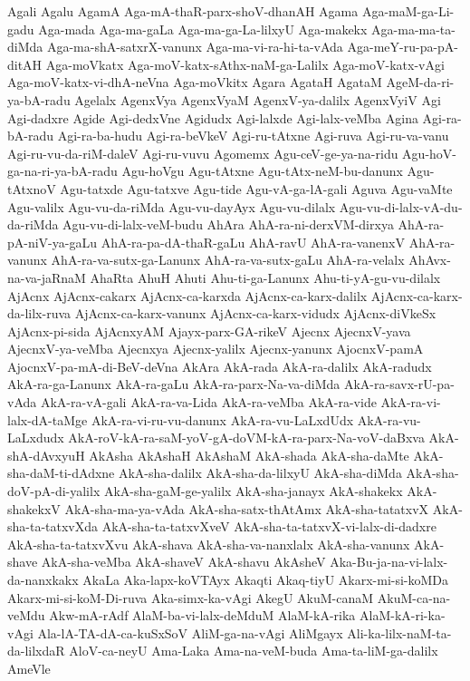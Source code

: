 {Agali
Agalu
AgamA
Aga-mA-thaR-parx-shoV-dhanAH
Agama
Aga-maM-ga-Li-gadu
Aga-mada
Aga-ma-gaLa
Aga-ma-ga-La-lilxyU
Aga-makekx
Aga-ma-ma-ta-diMda
Aga-ma-shA-satxrX-vanunx
Aga-ma-vi-ra-hi-ta-vAda
Aga-meY-ru-pa-pA-ditAH
Aga-moVkatx
Aga-moV-katx-sAthx-naM-ga-Lalilx
Aga-moV-katx-vAgi
Aga-moV-katx-vi-dhA-neVna
Aga-moVkitx
Agara
AgataH
AgataM
AgeM-da-ri-ya-bA-radu
Agelalx
AgenxVya
AgenxVyaM
AgenxV-ya-dalilx
AgenxVyiV
Agi
Agi-dadxre
Agide
Agi-dedxVne
Agidudx
Agi-lalxde
Agi-lalx-veMba
Agina
Agi-ra-bA-radu
Agi-ra-ba-hudu
Agi-ra-beVkeV
Agi-ru-tAtxne
Agi-ruva
Agi-ru-va-vanu
Agi-ru-vu-da-riM-daleV
Agi-ru-vuvu
Agomemx
Agu-ceV-ge-ya-na-ridu
Agu-hoV-ga-na-ri-ya-bA-radu
Agu-hoVgu
Agu-tAtxne
Agu-tAtx-neM-bu-danunx
Agu-tAtxnoV
Agu-tatxde
Agu-tatxve
Agu-tide
Agu-vA-ga-lA-gali
Aguva
Agu-vaMte
Agu-valilx
Agu-vu-da-riMda
Agu-vu-dayAyx
Agu-vu-dilalx
Agu-vu-di-lalx-vA-du-da-riMda
Agu-vu-di-lalx-veM-budu
AhAra
AhA-ra-ni-derxVM-dirxya
AhA-ra-pA-niV-ya-gaLu
AhA-ra-pa-dA-thaR-gaLu
AhA-ravU
AhA-ra-vanenxV
AhA-ra-vanunx
AhA-ra-va-sutx-ga-Lanunx
AhA-ra-va-sutx-gaLu
AhA-ra-velalx
AhAvx-na-va-jaRnaM
AhaRta
AhuH
Ahuti
Ahu-ti-ga-Lanunx
Ahu-ti-yA-gu-vu-dilalx
AjAcnx
AjAcnx-cakarx
AjAcnx-ca-karxda
AjAcnx-ca-karx-dalilx
AjAcnx-ca-karx-da-lilx-ruva
AjAcnx-ca-karx-vanunx
AjAcnx-ca-karx-vidudx
AjAcnx-diVkeSx
AjAcnx-pi-sida
AjAcnxyAM
Ajayx-parx-GA-rikeV
Ajecnx
AjecnxV-yava
AjecnxV-ya-veMba
Ajecnxya
Ajecnx-yalilx
Ajecnx-yanunx
AjocnxV-pamA
AjocnxV-pa-mA-di-BeV-deVna
AkAra
AkA-rada
AkA-ra-dalilx
AkA-radudx
AkA-ra-ga-Lanunx
AkA-ra-gaLu
AkA-ra-parx-Na-va-diMda
AkA-ra-savx-rU-pa-vAda
AkA-ra-vA-gali
AkA-ra-va-Lida
AkA-ra-veMba
AkA-ra-vide
AkA-ra-vi-lalx-dA-taMge
AkA-ra-vi-ru-vu-danunx
AkA-ra-vu-LaLxdUdx
AkA-ra-vu-LaLxdudx
AkA-roV-kA-ra-saM-yoV-gA-doVM-kA-ra-parx-Na-voV-daBxva
AkA-shA-dAvxyuH
AkAsha
AkAshaH
AkAshaM
AkA-shada
AkA-sha-daMte
AkA-sha-daM-ti-dAdxne
AkA-sha-dalilx
AkA-sha-da-lilxyU
AkA-sha-diMda
AkA-sha-doV-pA-di-yalilx
AkA-sha-gaM-ge-yalilx
AkA-sha-janayx
AkA-shakekx
AkA-shakekxV
AkA-sha-ma-ya-vAda
AkA-sha-satx-thAtAmx
AkA-sha-tatatxvX
AkA-sha-ta-tatxvXda
AkA-sha-ta-tatxvXveV
AkA-sha-ta-tatxvX-vi-lalx-di-dadxre
AkA-sha-ta-tatxvXvu
AkA-shava
AkA-sha-va-nanxlalx
AkA-sha-vanunx
AkA-shave
AkA-sha-veMba
AkA-shaveV
AkA-shavu
AkAsheV
Aka-Bu-ja-na-vi-lalx-da-nanxkakx
AkaLa
Aka-lapx-koVTAyx
Akaqti
Akaq-tiyU
Akarx-mi-si-koMDa
Akarx-mi-si-koM-Di-ruva
Aka-simx-ka-vAgi
AkegU
AkuM-canaM
AkuM-ca-na-veMdu
Akw-mA-rAdf
AlaM-ba-vi-lalx-deMduM
AlaM-kA-rika
AlaM-kA-ri-ka-vAgi
Ala-lA-TA-dA-ca-kuSxSoV
AliM-ga-na-vAgi
AliMgayx
Ali-ka-lilx-naM-ta-da-lilxdaR
AloV-ca-neyU
Ama-Laka
Ama-na-veM-buda
Ama-ta-liM-ga-dalilx
AmeVle
}
